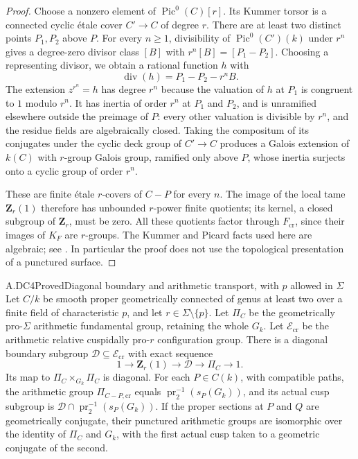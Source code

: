 \begin{proof}
Choose a nonzero element of $\operatorname{Pic}^0(C)[r]$.
Its Kummer torsor is a connected cyclic \'etale cover $C'\to C$
of degree $r$. There are at least two distinct points $P_1,P_2$ above
$P$. For every $n\geq1$, divisibility of $\operatorname{Pic}^0(C')(k)$
under $r^n$ gives a degree-zero divisor class $[B]$ with
$r^n[B]=[P_1-P_2]$. Choosing a representing divisor, we obtain a
rational function $h$ with
\[
 \operatorname{div}(h)=P_1-P_2-r^nB.
\]
The extension $z^{r^n}=h$ has degree $r^n$ because the valuation of
$h$ at $P_1$ is congruent to $1$ modulo $r^n$. It has inertia of
order $r^n$ at $P_1$ and $P_2$, and is unramified elsewhere outside
the preimage of $P$: every other valuation is divisible by $r^n$,
and the residue fields are algebraically closed. Taking the compositum
of its conjugates under the cyclic deck group of $C'\to C$ produces
a Galois extension of $k(C)$ with $r$-group Galois group, ramified
only above $P$, whose inertia surjects onto a cyclic group of order
$r^n$.

These are finite \'etale $r$-covers of $C-P$ for every $n$.
The image of the local tame $\mathbf Z_r(1)$ therefore has unbounded
$r$-power finite quotients; its kernel, a closed subgroup of
$\mathbf Z_r$, must be zero. All these quotients factor through
$F_{\mathrm{cr}}$, since their images of $K_F$ are $r$-groups.
The Kummer and Picard facts used here are algebraic; see
\citet[Propositions 14.1--14.2]{CF_Milne2013}. In particular the proof
does not use the topological presentation of a punctured surface.
\end{proof}

\begin{claim}{A.DC4}{Proved}{Diagonal boundary and arithmetic transport, with $p$ allowed in $\Sigma$}
Let $C/k$ be smooth proper geometrically connected of genus at least
two over a finite field of characteristic $p$, and let
$r\in\Sigma\setminus\{p\}$. Let $\Pi_C$ be the geometrically
pro-$\Sigma$ arithmetic fundamental group, retaining the whole $G_k$.
Let $\mathcal E_{\mathrm{cr}}$ be the arithmetic relative
cuspidally pro-$r$ configuration group. There is a diagonal boundary
subgroup $\mathcal D\subseteq\mathcal E_{\mathrm{cr}}$ with exact
sequence
\[
 1\to\mathbf Z_r(1)\to\mathcal D\to\Pi_C\to1.
\]
Its map to $\Pi_C\times_{G_k}\Pi_C$ is diagonal.
For each $P\in C(k)$, with compatible paths, the arithmetic group
$\Pi_{C-P,\mathrm{cr}}$ equals
$\operatorname{pr}_2^{-1}(s_P(G_k))$, and its actual cusp subgroup
is $\mathcal D\cap\operatorname{pr}_2^{-1}(s_P(G_k))$.
If the proper sections at $P$ and $Q$ are geometrically conjugate,
their punctured arithmetic groups are isomorphic over the identity of
$\Pi_C$ and $G_k$, with the first actual cusp taken to a geometric
conjugate of the second.
\end{claim}

